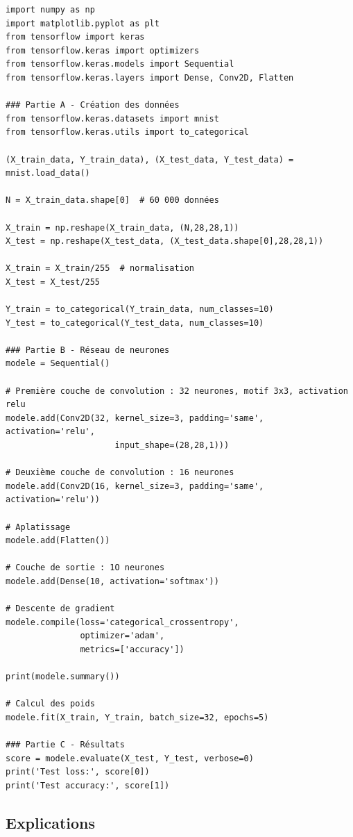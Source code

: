 \documentclass[11pt,class=report,crop=false]{standalone}
\begin{document}
\begin{lstlisting}
import numpy as np
import matplotlib.pyplot as plt
from tensorflow import keras
from tensorflow.keras import optimizers
from tensorflow.keras.models import Sequential
from tensorflow.keras.layers import Dense, Conv2D, Flatten

### Partie A - Création des données
from tensorflow.keras.datasets import mnist
from tensorflow.keras.utils import to_categorical

(X_train_data, Y_train_data), (X_test_data, Y_test_data) = mnist.load_data()

N = X_train_data.shape[0]  # 60 000 données

X_train = np.reshape(X_train_data, (N,28,28,1))
X_test = np.reshape(X_test_data, (X_test_data.shape[0],28,28,1))

X_train = X_train/255  # normalisation
X_test = X_test/255

Y_train = to_categorical(Y_train_data, num_classes=10)
Y_test = to_categorical(Y_test_data, num_classes=10)

### Partie B - Réseau de neurones
modele = Sequential()

# Première couche de convolution : 32 neurones, motif 3x3, activation relu
modele.add(Conv2D(32, kernel_size=3, padding='same', activation='relu',
                      input_shape=(28,28,1)))

# Deuxième couche de convolution : 16 neurones
modele.add(Conv2D(16, kernel_size=3, padding='same', activation='relu'))

# Aplatissage 
modele.add(Flatten())

# Couche de sortie : 1O neurones
modele.add(Dense(10, activation='softmax'))

# Descente de gradient
modele.compile(loss='categorical_crossentropy',
               optimizer='adam',
               metrics=['accuracy'])

print(modele.summary())

# Calcul des poids
modele.fit(X_train, Y_train, batch_size=32, epochs=5)

### Partie C - Résultats
score = modele.evaluate(X_test, Y_test, verbose=0)
print('Test loss:', score[0])
print('Test accuracy:', score[1])
\end{lstlisting}


\subsection{Explications}
\end{document}

